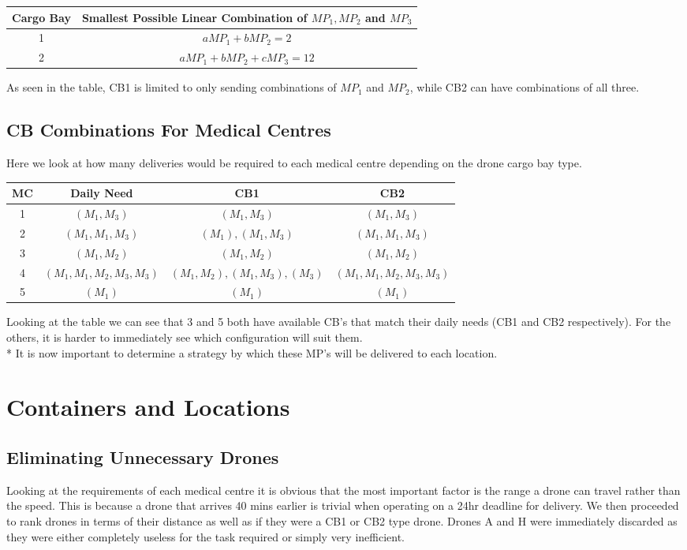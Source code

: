 \documentclass[a4paper,12pt]{article}
\begin{document}
\begin{center}
\begin{tabular}{ |c|c| }
 \hline
 Cargo Bay & Smallest Possible Linear Combination of $MP_1, MP_2$ and $MP_3$\\\hline
 1 & $aMP_1 + bMP_2 = 2$  \\
 2 & $aMP_1 + bMP_2 + cMP_3 = 12$ \\
 \hline
\end{tabular}
\end{center}

As seen in the table, CB1 is limited to only sending combinations of $MP_1$ and $MP_2$, while CB2 can have combinations of all three.

\subsection{CB Combinations For Medical Centres}
Here we look at how many deliveries would be required to each medical centre depending on the drone cargo bay type.
\begin{center}
\begin{tabular}{ |c|c|c|c| }
 \hline
 MC & Daily Need & CB1 & CB2 \\\hline
  1 & $(M_1,M_3)$ & $(M_1,M_3)$ & $(M_1,M_3)$  \\
  2 & $(M_1,M_1,M_3)$ & $(M_1),(M_1,M_3)$ & $(M_1,M_1,M_3)$  \\
  3 & $(M_1,M_2)$ & $(M_1,M_2)$ & $ (M_1,M_2)$  \\
  4 & $(M_1,M_1,M_2,M_3,M_3)$ & $(M_1,M_2),(M_1,M_3),(M_3)$ & $(M_1,M_1,M_2,M_3,M_3)$  \\
  5 & $(M_1)$ & $(M_1)$ & $(M_1)$  \\
\hline
\end{tabular}
\end{center}
Looking at the table we can see that 3 and 5 both have available CB's that match their daily needs (CB1 and CB2 respectively).
For the others, it is harder to immediately see which configuration will suit them.\\*
It is now important to determine a strategy by which these MP's will be delivered to each location.

\section{Containers and Locations}
\subsection{Eliminating Unnecessary Drones}
Looking at the requirements of each medical centre it is obvious that the most important factor is the range a drone can travel rather than the speed.
This is because a drone that arrives 40 mins earlier is trivial when operating on a 24hr deadline for delivery.
We then proceeded to rank drones in terms of their distance as well as if they were a CB1 or CB2 type drone.
Drones A and H were immediately discarded as they were either completely useless for the task required or simply very inefficient.
\end{document}
